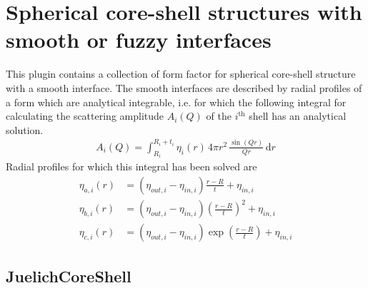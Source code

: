 \clearpage
\section{Spherical core-shell structures with smooth or fuzzy interfaces}
This plugin contains a collection of form factor for spherical core-shell structure with a smooth interface.
The smooth interfaces are described by radial profiles of a form which are analytical integrable, i.e. for which
the following integral for calculating the scattering amplitude $A_i(Q)$ of the $i^\textrm{th}$ shell
has an analytical solution.
\begin{align}
A_i(Q) = \int_{R_i}^{R_i+t_i} \eta_i(r)\, 4\pi r^2 \,\frac{\sin\left( Qr\right)}{Qr} \, \mathrm{d}r
\end{align}
Radial profiles for which this integral has been solved are
\begin{subequations}
\begin{align}
\eta_{a,i}(r) &= \left(\eta_{out,i}-\eta_{in,i}\right)\frac{r-R}{t}+\eta_{in,i}\\
\eta_{b,i}(r) &= \left(\eta_{out,i}-\eta_{in,i}\right)\left(\frac{r-R}{t}\right)^2+\eta_{in,i}\\
\eta_{c,i}(r) &= \left(\eta_{out,i}-\eta_{in,i}\right)\exp\left(\frac{r-R}{t}\right)+\eta_{in,i}
\end{align}
\end{subequations}



\clearpage
\subsection{JuelichCoreShell} ~\\

